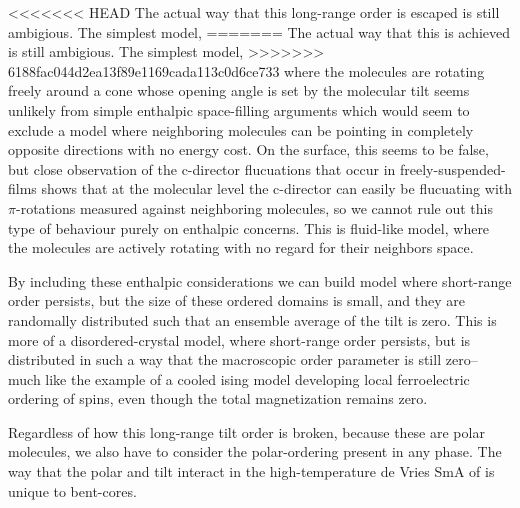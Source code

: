 \documentclass[aagreenthesis]{subfiles}
\begin{document}
<<<<<<< HEAD
The actual way that this long-range order is escaped is still ambigious. The simplest model,
=======
The actual way that this is achieved is still ambigious. The simplest model,
>>>>>>> 6188fac044d2ea13f89e1169cada113c0d6ce733
where the molecules are rotating freely around a cone whose opening angle is
set by the molecular tilt seems unlikely from simple enthalpic space-filling
arguments which would seem to exclude a model where neighboring molecules can be
pointing in completely opposite directions with no energy cost. On the surface,
this seems to be false, but close observation of the c-director flucuations
that occur in freely-suspended-films shows that at the molecular level the
c-director can easily be flucuating with $\pi$-rotations measured against
neighboring molecules, so we cannot rule out this type of behaviour purely on
enthalpic concerns. This is
fluid-like model, where the molecules are actively rotating with no regard for their
neighbors space.

By including these enthalpic considerations we can build model where short-range order persists, but the size of
these ordered domains is small, and they are randomally distributed such that
an ensemble average of the tilt is zero. This is more of a disordered-crystal
model, where short-range order persists, but is distributed in such a way that the
macroscopic order parameter is still zero-- much like the example of a cooled
ising model developing local ferroelectric ordering of spins, even though the
total magnetization remains zero. 

Regardless of how this long-range tilt order is broken, because these are polar
molecules, we also have to consider the polar-ordering present in any phase.
The way that the polar and tilt interact in the high-temperature de Vries SmA of
\nfour{} is unique to bent-cores.
\end{document}
